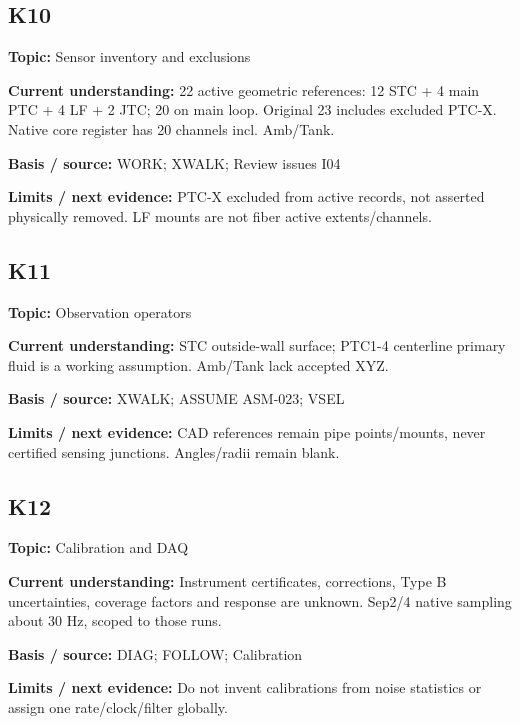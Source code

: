 \documentclass[11pt]{article}
\begin{document}
\par\noindent\begin{minipage}{\textwidth}\small\setlength{\parskip}{2pt}
\subsection*{K10}
\textbf{Topic:} Sensor inventory and exclusions\par
\textbf{Current understanding:} 22 active geometric references: 12 STC + 4 main PTC + 4 LF + 2 JTC; 20 on main loop. Original 23 includes excluded PTC-X. Native core register has 20 channels incl. Amb/Tank.\par
\textbf{Basis / source:} WORK; XWALK; Review issues I04\par
\textbf{Limits / next evidence:} PTC-X excluded from active records, not asserted physically removed. LF mounts are not fiber active extents/channels.\par
\end{minipage}\par\vspace{5pt}
\par\noindent\begin{minipage}{\textwidth}\small\setlength{\parskip}{2pt}
\subsection*{K11}
\textbf{Topic:} Observation operators\par
\textbf{Current understanding:} STC outside-wall surface; PTC1-4 centerline primary fluid is a working assumption. Amb/Tank lack accepted XYZ.\par
\textbf{Basis / source:} XWALK; ASSUME ASM-023; VSEL\par
\textbf{Limits / next evidence:} CAD references remain pipe points/mounts, never certified sensing junctions. Angles/radii remain blank.\par
\end{minipage}\par\vspace{5pt}
\par\noindent\begin{minipage}{\textwidth}\small\setlength{\parskip}{2pt}
\subsection*{K12}
\textbf{Topic:} Calibration and DAQ\par
\textbf{Current understanding:} Instrument certificates, corrections, Type B uncertainties, coverage factors and response are unknown. Sep2/4 native sampling about 30 Hz, scoped to those runs.\par
\textbf{Basis / source:} DIAG; FOLLOW; Calibration\par
\textbf{Limits / next evidence:} Do not invent calibrations from noise statistics or assign one rate/clock/filter globally.\par
\end{minipage}\par\vspace{5pt}
\end{document}
